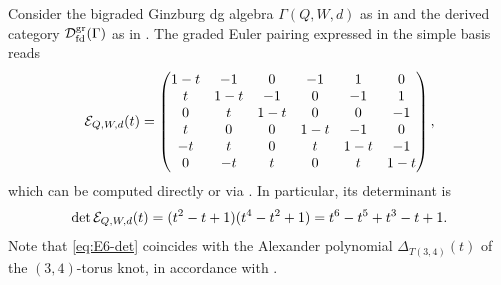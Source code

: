 Consider the bigraded Ginzburg dg algebra $\Gamma(Q,W,d)$ as in  and the derived category $\mathcal D^{\mathrm{gr}}_{\mathrm{fd}}(\Gamma)$ as in . The graded Euler pairing expressed in the simple basis reads
\begin{equation}\label{eq:E6-E}
 \mathcal E_{Q,W,d}(t)=
 \begin{pmatrix}
 1-t&-1&0&-1&1&0\\
 t&1-t&-1&0&-1&1\\
 0&t&1-t&0&0&-1\\
 t&0&0&1-t&-1&0\\
 -t&t&0&t&1-t&-1\\
 0&-t&t&0&t&1-t
 \end{pmatrix},
\end{equation}
which can be computed directly or via . In particular, its determinant is
\begin{equation}\label{eq:E6-det}
 \det\mathcal E_{Q,W,d}(t)
 =(t^2-t+1)(t^4-t^2+1)
 =t^6-t^5+t^3-t+1.
\end{equation}
Note that \eqref{eq:E6-det} coincides with the Alexander polynomial $\Delta_{T(3,4)}(t)$ of the $(3,4)$-torus knot, in accordance with .\\

